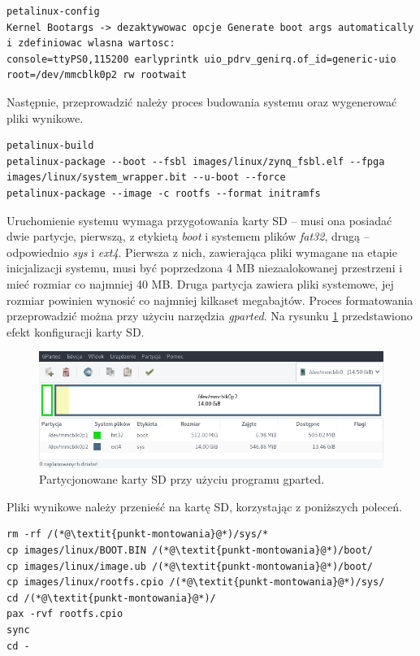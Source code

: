 \begin{lstlisting}[breaklines=true]
petalinux-config
Kernel Bootargs -> dezaktywowac opcje Generate boot args automatically i zdefiniowac wlasna wartosc:
console=ttyPS0,115200 earlyprintk uio_pdrv_genirq.of_id=generic-uio root=/dev/mmcblk0p2 rw rootwait 
\end{lstlisting}
Następnie, przeprowadzić należy proces budowania systemu oraz wygenerować pliki wynikowe.

\begin{lstlisting}[breaklines=true]
petalinux-build
petalinux-package --boot --fsbl images/linux/zynq_fsbl.elf --fpga images/linux/system_wrapper.bit --u-boot --force
petalinux-package --image -c rootfs --format initramfs
\end{lstlisting}

Uruchomienie systemu wymaga przygotowania karty SD -- musi ona posiadać dwie partycje, pierwszą, z etykietą \emph{boot} i systemem plików \emph{fat32}, drugą -- odpowiednio \emph{sys} i \emph{ext4}. 
Pierwsza z nich, zawierająca pliki wymagane na etapie inicjalizacji systemu, musi być poprzedzona 4 MB niezaalokowanej przestrzeni i mieć rozmiar co najmniej 40 MB. 
Druga partycja zawiera pliki systemowe, jej rozmiar powinien wynosić co najmniej kilkaset megabajtów. 
Proces formatowania przeprowadzić można przy użyciu narzędzia \emph{gparted}. Na rysunku \ref{fig:gparted-screen} przedstawiono efekt konfiguracji karty SD.

\begin{figure}[H]
	\centering
	\includegraphics[width=12cm]{img/gparted-screen.png}
	\caption{Partycjonowane karty SD przy użyciu programu gparted.}
	\label{fig:gparted-screen}
\end{figure}

Pliki wynikowe należy przenieść na kartę SD, korzystając z poniższych poleceń.

\begin{lstlisting}[breaklines=true]
rm -rf /(*@\textit{punkt-montowania}@*)/sys/*
cp images/linux/BOOT.BIN /(*@\textit{punkt-montowania}@*)/boot/
cp images/linux/image.ub /(*@\textit{punkt-montowania}@*)/boot/
cp images/linux/rootfs.cpio /(*@\textit{punkt-montowania}@*)/sys/
cd /(*@\textit{punkt-montowania}@*)/
pax -rvf rootfs.cpio
sync
cd -
\end{lstlisting}

